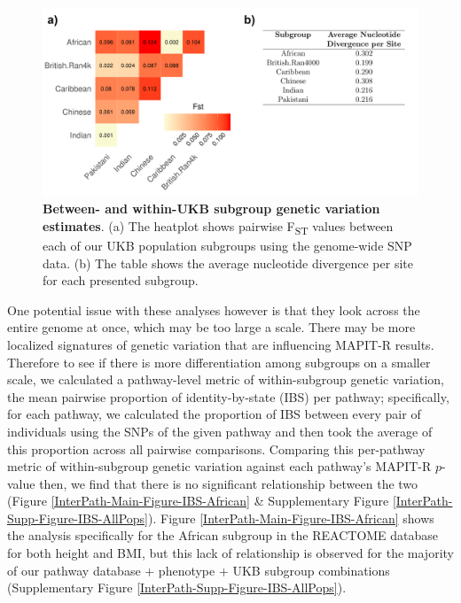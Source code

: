 \documentclass[12pt,a4paper]{article}
\begin{document}
\begin{figure}[htb]
\centering
\hspace*{-2cm}
\includegraphics[scale=.5]{Images/Main/InterPath_Main_Figure_Fst_vs3.png}
\caption[TBD]{\textbf{Between- and within-UKB subgroup genetic variation estimates}. (a) The heatplot shows pairwise F\textsubscript{ST} values between each of our UKB population subgroups using the genome-wide SNP data. (b) The table shows the average nucleotide divergence per site for each presented subgroup.}
\label{InterPath-Main-Figure-Fst}
\end{figure}


One potential issue with these analyses however is that they look across the entire genome at once, which may be too large a scale. There may be more localized signatures of genetic variation that are influencing MAPIT-R results. Therefore to see if there is more differentiation among subgroups on a smaller scale, we calculated a pathway-level metric of within-subgroup genetic variation, the mean pairwise proportion of identity-by-state (IBS) per pathway;  specifically, for each pathway, we calculated the proportion of IBS between every pair of individuals using the SNPs of the given pathway and then took the average of this proportion across all pairwise comparisons.  Comparing this per-pathway metric of within-subgroup genetic variation against each pathway's MAPIT-R $p$-value then, we find that there is no significant relationship between the two (Figure \ref{InterPath-Main-Figure-IBS-African} \& Supplementary Figure \ref{InterPath-Supp-Figure-IBS-AllPops}). Figure \ref{InterPath-Main-Figure-IBS-African} shows the analysis specifically for the African subgroup in the REACTOME database for both height and BMI, but this lack of relationship is observed for the majority of our pathway database + phenotype + UKB subgroup combinations (Supplementary Figure \ref{InterPath-Supp-Figure-IBS-AllPops}). 
\end{document}
